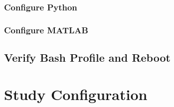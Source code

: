 \documentclass[12pt]{sop}
\begin{document}
\subsubsection{Configure Python}

\subsubsection{Configure MATLAB}

\subsection{Verify Bash Profile and Reboot}

\section{Study Configuration}
\end{document}
